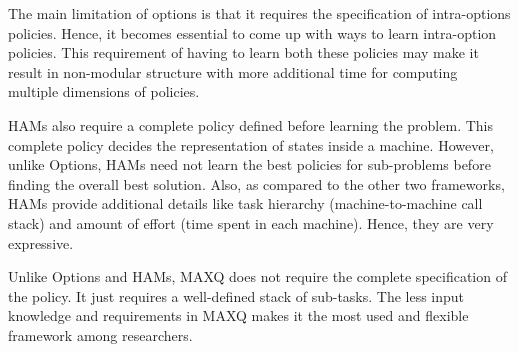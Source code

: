 The main limitation of options is that it requires the specification of intra-options policies.
Hence, it becomes essential to come up with ways to learn intra-option policies.  This requirement of having to learn both these policies may make it result in non-modular structure with more additional time for computing multiple dimensions of policies. 

HAMs also require a complete policy defined before learning the problem. This complete policy decides the representation of states inside a machine. However, unlike Options, HAMs need not learn the best policies for sub-problems before finding the overall best solution. Also, as compared to the other two frameworks, HAMs provide additional details like task hierarchy (machine-to-machine call stack) and amount of effort (time spent in each machine). Hence, they are very expressive. 

Unlike Options and HAMs, MAXQ does not require the complete specification of the policy. It just requires a well-defined stack of sub-tasks. The less input knowledge and requirements in MAXQ makes it the most used and flexible framework among researchers.
